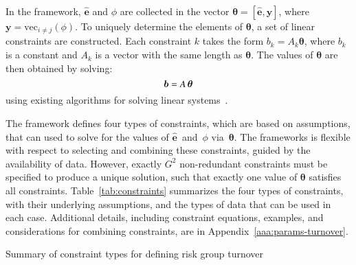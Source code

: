 In the framework,
$\bm{\hat{e}}$ and $\phi$ are collected in the vector
$\bm{\theta} = \left[\bm{\hat{e}}, \bm{y}\right]$,
where $\bm{y} = \mathrm{vec}_{i \ne j}(\phi)$.
To uniquely determine the elements of $\bm{\theta}$,
a set of linear constraints are constructed.
Each constraint $k$ takes the form
$b_k = A_k \bm{\theta}$,
where $b_k$ is a constant and $A_k$ is a vector with the same length as $\bm{\theta}$.
The values of $\bm{\theta}$ are then obtained by solving:
\begin{equation}\label{eq:system-matrix}
\bm{b} = A \thinspace \bm{\theta}
\end{equation}
using existing algorithms for solving linear systems~\citep{LAPACK}.
\par
The framework defines four types of constraints, which are based on assumptions,
that can used to solve for the values of
$\bm{\hat{e}}$~and~$\phi$ via~$\bm{\theta}$.
The frameworks is flexible with respect to
selecting and combining these constraints,
guided by the availability of data.
However, exactly $G^2$ non-redundant constraints must be specified
to produce a unique solution,
such that exactly one value of $\bm{\theta}$ satisfies all constraints.
Table~\ref{tab:constraints} summarizes
the four types of constraints,
with their underlying assumptions,
and the types of data that can be used in each case.
Additional details, including
constraint equations, examples, and considerations for combining constraints,
are in Appendix~\ref{aaa:params-turnover}.
\begin{table}
  \caption{Summary of constraint types for defining risk group turnover}
  \label{tab:constraints}
  
\end{table}
